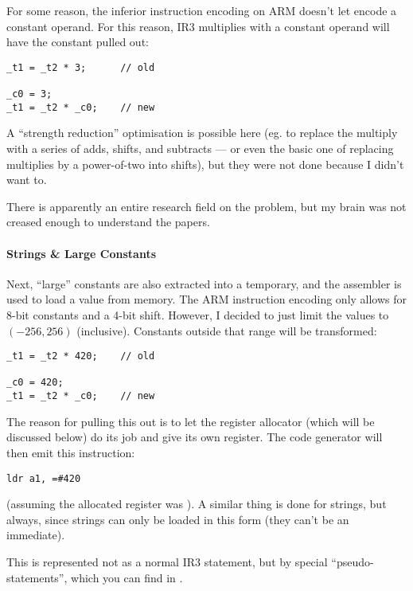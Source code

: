 \documentclass[12pt]{article}
\begin{document}
For some reason, the inferior instruction encoding on ARM doesn't let  encode a constant operand. For this
reason, IR3 multiplies with a constant operand will have the constant pulled out:

\begin{verbatim}
_t1 = _t2 * 3;      // old

_c0 = 3;
_t1 = _t2 * _c0;    // new
\end{verbatim}

A \enquote{strength reduction} optimisation is possible here (eg. to replace the multiply with a series of adds, shifts,
and subtracts --- or even the basic one of replacing multiplies by a power-of-two into shifts), but they were not done
because I didn't want to.

There is apparently an entire research field on the  problem, but my brain was not
creased enough to understand the papers.


\paragraph{Strings \& Large Constants}

Next, \enquote{large} constants are also extracted into a temporary, and the assembler is used to load a value from
memory. The ARM instruction encoding only allows for 8-bit constants and a 4-bit shift. However, I decided
to just limit the values to $(-256, 256)$ (inclusive). Constants outside that range will be transformed:

\begin{verbatim}
_t1 = _t2 * 420;    // old

_c0 = 420;
_t1 = _t2 * _c0;    // new
\end{verbatim}

The reason for pulling this out is to let the register allocator (which will be discussed below) do its job and give
 its own register. The code generator will then emit this instruction:

\begin{verbatim}
ldr a1, =#420
\end{verbatim}

(assuming the allocated register was ). A similar thing is done for strings, but always, since strings can
only be loaded in this form (they can't be an immediate).

This is represented not as a normal IR3 statement, but by special \enquote{pseudo-statements}, which you can find in
.
\end{document}
